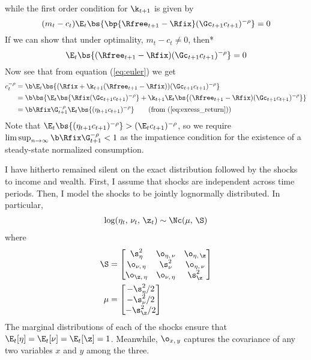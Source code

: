 while the first order condition for $\k_{t+1}$ is given by
\begin{equation}\label{eq:excess_return}
    (m_t - c_t)\E_{t}\bs{\bp{\Rfree_{t+1} - \Rfix}(\Gc_{t+1}c_{t+1})^{-\rho}} = 0
\end{equation}
If we can show that under optimality, $m_t - c_t \neq 0$, then*
\[
\E_{t}\bs{(\Rfree_{t+1} - \Rfix)(\Gc_{t+1}c_{t+1})^{-\rho}} = 0
\]
Now see that from equation (\ref{eq:euler}) we get
\begin{align*}
    c_{t}^{-\rho} &= \b \E_{t}\bs{(\Rfix + \k_{t+1}(\Rfree_{t+1} - \Rfix))(\Gc_{t+1}c_{t+1})^{-\rho}}\\
    &= \b \bs{\E_{t}\bs{\Rfix(\Gc_{t+1}c_{t+1})^{-\rho}} + \k_{t+1}\E_{t}\bs{(\Rfree_{t+1} - \Rfix)(\Gc_{t+1}c_{t+1})^{-\rho}}}\\
    &= \b\Rfix\G_{t+1}^{-\rho}\E_{t}\bs{(\eta_{t+1}c_{t+1})^{-\rho}} \tag{from (\ref{eq:excess_return})}
\end{align*}
Note that $\E_{t}\bs{(\eta_{t+1}c_{t+1})^{-\rho}} > (\E_{t}c_{t+1})^{-\rho}$, so we require $\limsup_{n\to \infty}\b\Rfix\G_{t+1}^{-\rho} < 1$ as the impatience condition for the existence of a steady-state normalized consumption.

I have hitherto remained silent on the exact distribution followed by the shocks to income and wealth. First, I assume that shocks are independent across time periods. Then, I model the shocks to be jointly lognormally distributed. In particular,
\begin{align*}
    \log (\eta_t,\,\nu_t,\,\z_t) \sim \Nc(\mu,\,\S)
\end{align*}
where
\begin{align*}
    \S &= \begin{bmatrix}
        \s_{\eta}^2 & \o_{\eta,\,\nu} & \o_{\eta,\,\z}\\
        \o_{\nu,\,\eta} & \s_{\nu}^2 & \o_{\eta,\,\nu}\\
        \o_{\z,\,\eta} & \o_{\nu,\,\eta} & \s_{\z}^2
    \end{bmatrix}\\
    \mu &= \begin{bmatrix}
        -\s_{\eta}^2 / 2\\
        -\s_{\nu}^2 / 2\\
        -\s_{\z}^2 / 2
    \end{bmatrix}
\end{align*}
The marginal distributions of each of the shocks ensure that $\E_t[\eta] = \E_t[\nu] = \E_t[\z] = 1$. Meanwhile, $\o_{x,\,y}$ captures the covariance of any two variables $x$ and $y$ among the three.

